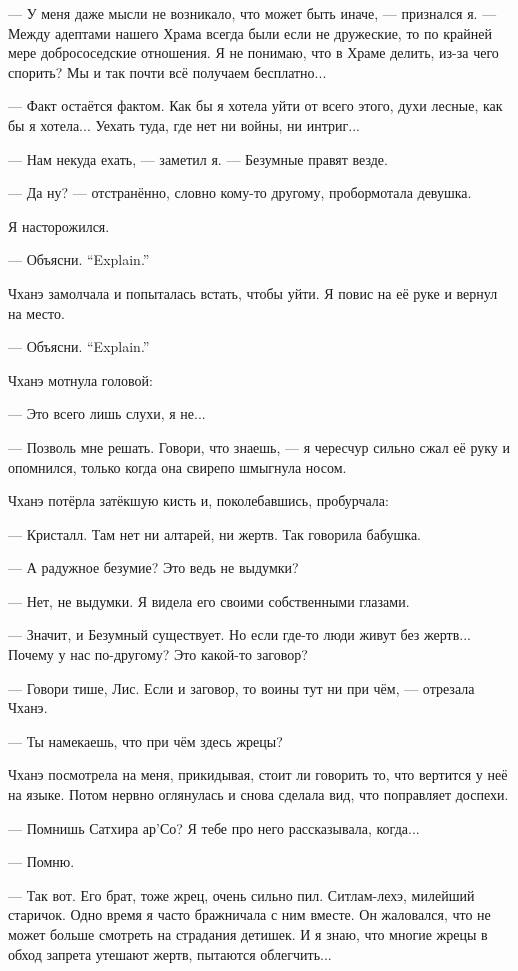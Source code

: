 --- У меня даже мысли не возникало, что может быть иначе, --- признался я.
--- Между адептами нашего Храма всегда были если не дружеские, то по крайней мере добрососедские отношения.
Я не понимаю, что в Храме делить, из-за чего спорить?
Мы и так почти всё получаем бесплатно...

--- Факт остаётся фактом.
Как бы я хотела уйти от всего этого, духи лесные, как бы я хотела...
Уехать туда, где нет ни войны, ни интриг...

--- Нам некуда ехать, --- заметил я.
--- Безумные правят везде.

--- Да ну? --- отстранённо, словно кому-то другому, пробормотала девушка.

Я насторожился.

{--- Объясни.}
{``Explain.''}

Чханэ замолчала и попыталась встать, чтобы уйти.
Я повис на её руке и вернул на место.

{--- Объясни.}
{``Explain.''}

Чханэ мотнула головой:

--- Это всего лишь слухи, я не...

--- Позволь мне решать.
Говори, что знаешь, --- я чересчур сильно сжал её руку и опомнился, только когда она свирепо шмыгнула носом.

Чханэ потёрла затёкшую кисть и, поколебавшись, пробурчала:

--- Кристалл.
Там нет ни алтарей, ни жертв.
Так говорила бабушка.

--- А радужное безумие?
Это ведь не выдумки?

--- Нет, не выдумки.
Я видела его своими собственными глазами.

--- Значит, и Безумный существует.
Но если где-то люди живут без жертв...
Почему у нас по-другому?
Это какой-то заговор?

--- Говори тише, Лис.
Если и заговор, то воины тут ни при чём, --- отрезала Чханэ.

--- Ты намекаешь, что при чём здесь жрецы?

Чханэ посмотрела на меня, прикидывая, стоит ли говорить то, что вертится у неё на языке.
Потом нервно оглянулась и снова сделала вид, что поправляет доспехи.

--- Помнишь Сатхира ар’Со?
Я тебе про него рассказывала, когда...

--- Помню.

--- Так вот.
Его брат, тоже жрец, очень сильно пил.
Ситлам-лехэ, милейший старичок.
Одно время я часто бражничала с ним вместе.
Он жаловался, что не может больше смотреть на страдания детишек.
И я знаю, что многие жрецы в обход запрета утешают жертв, пытаются облегчить...

